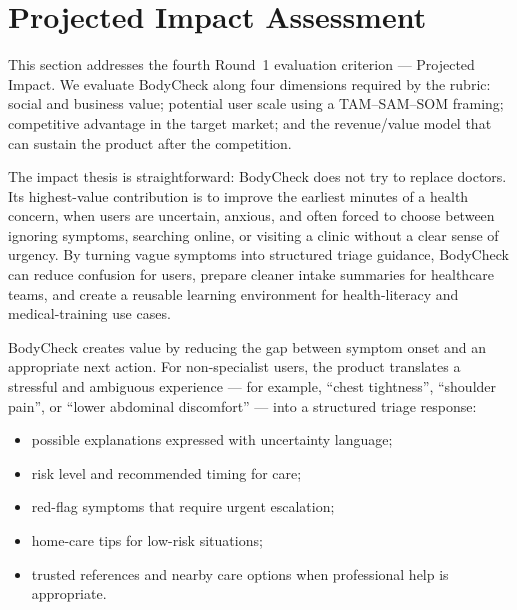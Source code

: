 %

\section{Projected Impact Assessment}
\label{sec:impact}

This section addresses the fourth Round~1 evaluation criterion ---
Projected Impact. We evaluate BodyCheck along four dimensions required by
the rubric: social and business value; potential user scale using a
TAM--SAM--SOM framing; competitive advantage in the target market; and the
revenue/value model that can sustain the product after the competition.

The impact thesis is straightforward: BodyCheck does not try to replace
doctors. Its highest-value contribution is to improve the earliest minutes of
a health concern, when users are uncertain, anxious, and often forced to choose
between ignoring symptoms, searching online, or visiting a clinic without a
clear sense of urgency. By turning vague symptoms into structured triage
guidance, BodyCheck can reduce confusion for users, prepare cleaner intake
summaries for healthcare teams, and create a reusable learning environment for
health-literacy and medical-training use cases.

BodyCheck creates value by reducing the gap between symptom onset and an
appropriate next action. For non-specialist users, the product translates a
stressful and ambiguous experience --- for example, ``chest tightness'',
``shoulder pain'', or ``lower abdominal discomfort'' --- into a structured
triage response:

\begin{itemize}[leftmargin=2em, itemsep=3pt, topsep=4pt]
  \item possible explanations expressed with uncertainty language;
  \item risk level and recommended timing for care;
  \item red-flag symptoms that require urgent escalation;
  \item home-care tips for low-risk situations;
  \item trusted references and nearby care options when professional help is
        appropriate.
\end{itemize}

